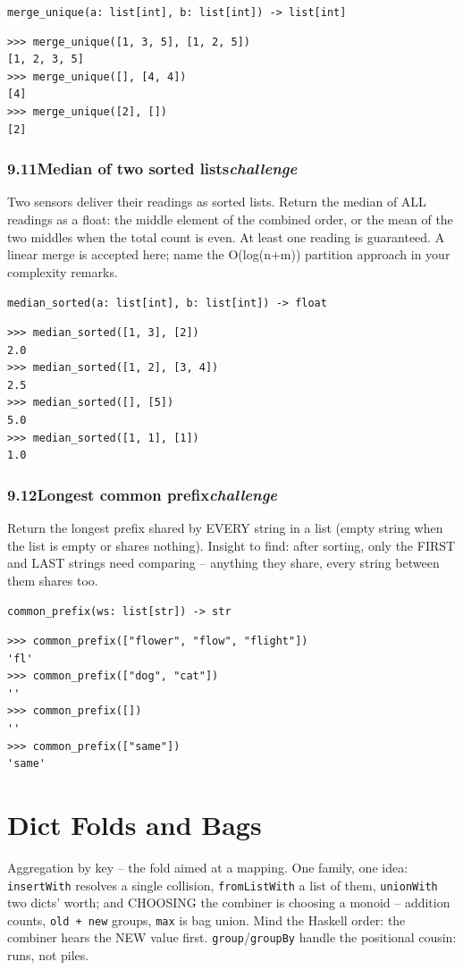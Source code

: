 \documentclass[10pt,letterpaper]{book}
\begin{document}
\noindent\texttt{merge\_unique(a: list[int], b: list[int]) -> list[int]}
\begin{lstlisting}[style=ex]
>>> merge_unique([1, 3, 5], [1, 2, 5])
[1, 2, 3, 5]
>>> merge_unique([], [4, 4])
[4]
>>> merge_unique([2], [])
[2]
\end{lstlisting}
\subsection*{9.11\quad Median of two sorted lists\hfill\textnormal{\textit{challenge}}}
Two sensors deliver their readings as sorted lists. Return the median of ALL readings as a float: the middle element of the combined order, or the mean of the two middles when the total count is even. At least one reading is guaranteed. A linear merge is accepted here; name the O(log(n+m)) partition approach in your complexity remarks.

\noindent\texttt{median\_sorted(a: list[int], b: list[int]) -> float}
\begin{lstlisting}[style=ex]
>>> median_sorted([1, 3], [2])
2.0
>>> median_sorted([1, 2], [3, 4])
2.5
>>> median_sorted([], [5])
5.0
>>> median_sorted([1, 1], [1])
1.0
\end{lstlisting}
\subsection*{9.12\quad Longest common prefix\hfill\textnormal{\textit{challenge}}}
Return the longest prefix shared by EVERY string in a list (empty string when the list is empty or shares nothing). Insight to find: after sorting, only the FIRST and LAST strings need comparing -- anything they share, every string between them shares too.

\noindent\texttt{common\_prefix(ws: list[str]) -> str}
\begin{lstlisting}[style=ex]
>>> common_prefix(["flower", "flow", "flight"])
'fl'
>>> common_prefix(["dog", "cat"])
''
>>> common_prefix([])
''
>>> common_prefix(["same"])
'same'
\end{lstlisting}
\clearpage
\chapter{Dict Folds and Bags}

Aggregation by key -- the fold aimed at a mapping. One family, one idea:
\texttt{insertWith} resolves a single collision, \texttt{fromListWith} a
list of them, \texttt{unionWith} two dicts' worth; and CHOOSING the combiner
is choosing a monoid -- addition counts, \texttt{old + new} groups,
\texttt{max} is bag union. Mind the Haskell order: the combiner hears the
NEW value first. \texttt{group}/\texttt{groupBy} handle the positional
cousin: runs, not piles.
\end{document}
